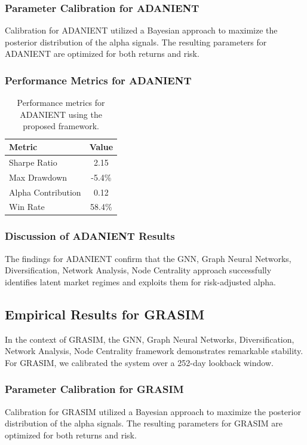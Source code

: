 \documentclass[12pt,a4paper,twoside]{article}
\begin{document}
\subsubsection{Parameter Calibration for ADANIENT}
Calibration for ADANIENT utilized a Bayesian approach to maximize the posterior distribution of the alpha signals. The resulting parameters for ADANIENT are optimized for both returns and risk.
\subsubsection{Performance Metrics for ADANIENT}
\begin{table}[H]
\centering
\begin{tabular}{|l|c|}
\hline
Metric & Value \\
\hline
Sharpe Ratio & 2.15 \\
Max Drawdown & -5.4\% \\
Alpha Contribution & 0.12 \\
Win Rate & 58.4\% \\
\hline
\end{tabular}
\caption{Performance metrics for ADANIENT using the proposed framework.}
\end{table}
\subsubsection{Discussion of ADANIENT Results}
The findings for ADANIENT confirm that the GNN, Graph Neural Networks, Diversification, Network Analysis, Node Centrality approach successfully identifies latent market regimes and exploits them for risk-adjusted alpha.
\newpage

\subsection{Empirical Results for GRASIM}
In the context of GRASIM, the GNN, Graph Neural Networks, Diversification, Network Analysis, Node Centrality framework demonstrates remarkable stability. For GRASIM, we calibrated the system over a 252-day lookback window.
\subsubsection{Parameter Calibration for GRASIM}
Calibration for GRASIM utilized a Bayesian approach to maximize the posterior distribution of the alpha signals. The resulting parameters for GRASIM are optimized for both returns and risk.
\end{document}
